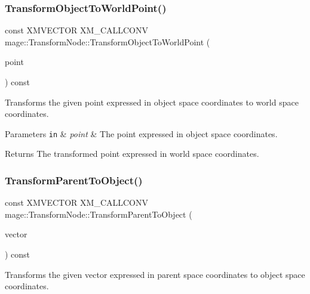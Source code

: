 \subsubsection{\texorpdfstring{Transform\+Object\+To\+World\+Point()}{TransformObjectToWorldPoint()}}
{\footnotesize\ttfamily const X\+M\+V\+E\+C\+T\+OR X\+M\+\_\+\+C\+A\+L\+L\+C\+O\+NV mage\+::\+Transform\+Node\+::\+Transform\+Object\+To\+World\+Point (\begin{DoxyParamCaption}\item[{F\+X\+M\+V\+E\+C\+T\+OR}]{point }\end{DoxyParamCaption}) const\hspace{0.3cm}{\ttfamily [noexcept]}}

Transforms the given point expressed in object space coordinates to world space coordinates.


\begin{DoxyParams}[1]{Parameters}
\mbox{\tt in}  & {\em point} & The point expressed in object space coordinates. \\
\hline
\end{DoxyParams}
\begin{DoxyReturn}{Returns}
The transformed point expressed in world space coordinates. 
\end{DoxyReturn}
\hypertarget{classmage_1_1_transform_node_aa649804646f82257522c5136f0d4d2a0}{}\label{classmage_1_1_transform_node_aa649804646f82257522c5136f0d4d2a0} 
\subsubsection{\texorpdfstring{Transform\+Parent\+To\+Object()}{TransformParentToObject()}}
{\footnotesize\ttfamily const X\+M\+V\+E\+C\+T\+OR X\+M\+\_\+\+C\+A\+L\+L\+C\+O\+NV mage\+::\+Transform\+Node\+::\+Transform\+Parent\+To\+Object (\begin{DoxyParamCaption}\item[{F\+X\+M\+V\+E\+C\+T\+OR}]{vector }\end{DoxyParamCaption}) const\hspace{0.3cm}{\ttfamily [noexcept]}}

Transforms the given vector expressed in parent space coordinates to object space coordinates.


